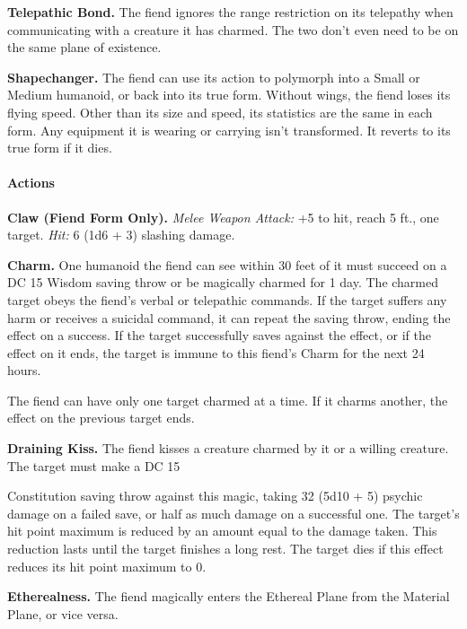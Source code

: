 \documentclass[
]{article}
\begin{document}
\textbf{Telepathic Bond.} The fiend ignores the range restriction on its
telepathy when communicating with a creature it has charmed. The two
don't even need to be on the same plane of existence.

\textbf{Shapechanger.} The fiend can use its action to polymorph into a
Small or Medium humanoid, or back into its true form. Without wings, the
fiend loses its flying speed. Other than its size and speed, its
statistics are the same in each form. Any equipment it is wearing or
carrying isn't transformed. It reverts to its true form if it dies.

\hypertarget{actions-14}{%
\paragraph{Actions}\label{actions-14}}

\textbf{Claw (Fiend Form Only).} \emph{Melee Weapon Attack:} +5 to hit,
reach 5 ft., one target. \emph{Hit:} 6 (1d6 + 3) slashing damage.

\textbf{Charm.} One humanoid the fiend can see within 30 feet of it must
succeed on a DC 15 Wisdom saving throw or be magically charmed for 1
day. The charmed target obeys the fiend's verbal or telepathic commands.
If the target suffers any harm or receives a suicidal command, it can
repeat the saving throw, ending the effect on a success. If the target
successfully saves against the effect, or if the effect on it ends, the
target is immune to this fiend's Charm for the next 24 hours.

The fiend can have only one target charmed at a time. If it charms
another, the effect on the previous target ends.

\textbf{Draining Kiss.} The fiend kisses a creature charmed by it or a
willing creature. The target must make a DC 15

Constitution saving throw against this magic, taking 32 (5d10 + 5)
psychic damage on a failed save, or half as much damage on a successful
one. The target's hit point maximum is reduced by an amount equal to the
damage taken. This reduction lasts until the target finishes a long
rest. The target dies if this effect reduces its hit point maximum to 0.

\textbf{Etherealness.} The fiend magically enters the Ethereal Plane
from the Material Plane, or vice versa.
\end{document}
